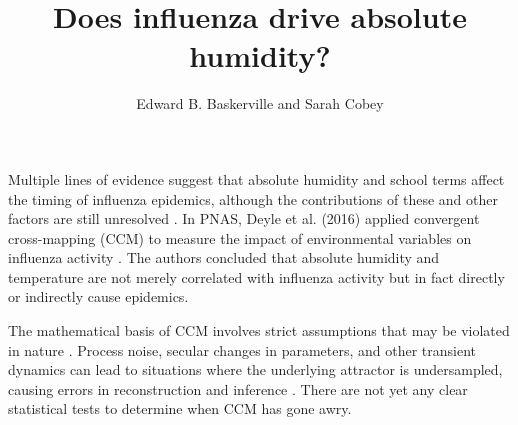 \documentclass[11pt]{article}
\title{Does influenza drive absolute humidity?}
\author{Edward B. Baskerville and Sarah Cobey}
\affil{Department of Ecology and Evolution, University of Chicago}
\begin{document}
\maketitle

Multiple lines of evidence suggest that absolute humidity and school terms affect the timing of influenza epidemics, although the contributions of these and other factors are still unresolved \cite{Bjornstad2016,Shaman2010a,Shaman2010b,Chao2010,Tamerius2015}.
In PNAS, Deyle et al. (2016) applied convergent cross-mapping (CCM) to measure the impact of environmental variables on influenza activity \cite{Deyle2016}. 
The authors concluded that absolute humidity and temperature are not merely correlated with influenza activity but in fact directly or indirectly cause epidemics.

The mathematical basis of CCM involves strict assumptions that may be violated in nature \cite{Sugihara2012}.
Process noise, secular changes in parameters, and other transient dynamics can lead to situations where the underlying attractor is undersampled, causing errors in reconstruction and inference \cite{Cobey2016}.
There are not yet any clear statistical tests to determine when CCM has gone awry.
 
\end{document}
